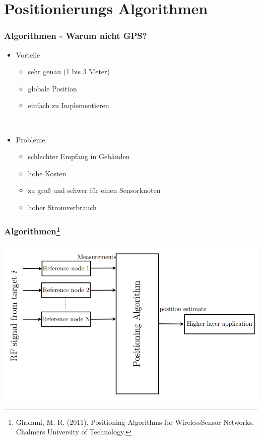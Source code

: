 \section{Positionierungs Algorithmen}
\label{sec:algorithmen}

\begin{frame}
  \frametitle{Algorithmen - Warum nicht GPS?}

  \begin{itemize}
  \item Vorteile
    \begin{itemize}
    \item sehr genau (1 bis 3 Meter)
    \item globale Position
    \item einfach zu Implementieren
    \end{itemize}
  ~\\
  \item Probleme
    \begin{itemize}
    \item schlechter Empfang in Gebäuden
    \item hohe Kosten
    \item zu groß und schwer für einen Sensorknoten
    \item hoher Stromverbrauch
    \end{itemize}
  \end{itemize}
\end{frame}

\begin{frame}
  \frametitle{Algorithmen\footnote{Gholami, M. R. (2011). Positioning Algorithms for
      WirelessSensor Networks. Chalmers University of Technology.}}

  \begin{center}
    \includegraphics[scale=0.35]{img/algo_1}
  \end{center}
\end{frame}

